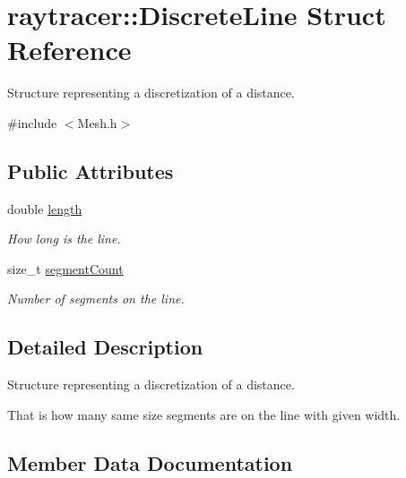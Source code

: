 \hypertarget{structraytracer_1_1DiscreteLine}{}\section{raytracer\+:\+:Discrete\+Line Struct Reference}
\label{structraytracer_1_1DiscreteLine}


Structure representing a discretization of a distance.  




{\ttfamily \#include $<$Mesh.\+h$>$}

\subsection*{Public Attributes}
\begin{DoxyCompactItemize}
\item 
double \hyperlink{structraytracer_1_1DiscreteLine_a9a6dc228b1d824f485f2e94965e7fe9a}{length}
\begin{DoxyCompactList}\small\item\em How long is the line. \end{DoxyCompactList}\item 
size\+\_\+t \hyperlink{structraytracer_1_1DiscreteLine_a80395f9fb7bed884f348199fca0f1ccf}{segment\+Count}
\begin{DoxyCompactList}\small\item\em Number of segments on the line. \end{DoxyCompactList}\end{DoxyCompactItemize}


\subsection{Detailed Description}
Structure representing a discretization of a distance. 

That is how many same size segments are on the line with given width. 

\subsection{Member Data Documentation}
\mbox{\label{structraytracer_1_1DiscreteLine_a9a6dc228b1d824f485f2e94965e7fe9a}} 
